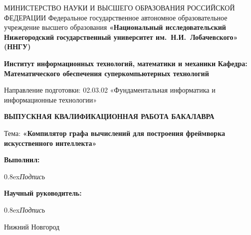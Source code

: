 {
\begin{titlepage}
  \begin{center}
    МИНИСТЕРСТВО НАУКИ И ВЫСШЕГО ОБРАЗОВАНИЯ РОССИЙСКОЙ ФЕДЕРАЦИИ\break
    Федеральное государственное автономное образовательное учреждение высшего образования\break
    \textbf{«Национальный исследовательский Нижегородский государственный университет им.~Н.И.~Лобачевского» (ННГУ)}
    \break

    \vspace*{1.25cm}

    \textbf{Институт информационных технологий, математики и механики}\break
    \textbf{Кафедра: Математического обеспечения суперкомпьютерных технологий}
    \vspace{0.5cm}

    Направление подготовки: 02.03.02 «Фундаментальная информатика и информационные технологии»\break

    \vspace{2.5cm}

    \large{\textbf{ВЫПУСКНАЯ КВАЛИФИКАЦИОННАЯ РАБОТА БАКАЛАВРА }}\break

    \vspace{0.25cm}

    Тема:\break
    \large{\textbf{«Компилятор графа вычислений для построения фреймворка искусственного интеллекта»}}
  \end{center}

\vspace{2cm}

\hfill\textbf{Выполнил:} 

 \hfill \makebox[2cm]{\hrulefill} 

 \hfill  {\raise0.8ex\hbox{\footnotesize \textit{Подпись}}} \makebox[5.65cm]{\hfill}

 \hfill\textbf{Научный руководитель:} 

 \hfill \makebox[2cm]{\hrulefill} 

 \hfill  {\raise0.8ex\hbox{\footnotesize \textit{Подпись}}} \makebox[5.55cm]{\hfill}

\vfill
\begin{center}
  Нижний Новгород
\end{center}
\end{titlepage}
}
